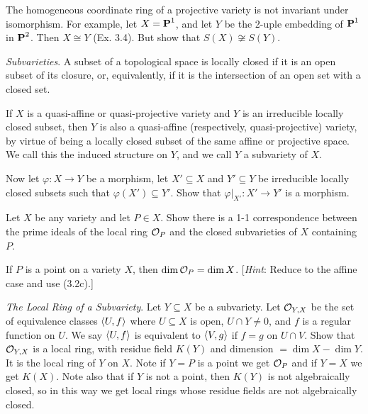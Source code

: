 \documentclass[10pt]{amsart}
\begin{document}
\begin{exercise}[3.9]
    The homogeneous coordinate ring of a projective variety is not invariant under 
    isomorphism. For example, let $X = \operatorname{\mathbf{P}}^1$, and let $Y$ be the 2-uple embedding of $\operatorname{\mathbf{P}}^1$ in $\operatorname{\mathbf{P}}^2$. 
    Then $X \cong Y$ (Ex. 3.4). But show that $S(X) \not\cong S(Y)$.
\end{exercise}


\begin{exercise}[3.10]
    \emph{Subvarieties}. A subset of a topological space is locally closed if it is an 
    open subset of its closure, or, equivalently, if it is the intersection of an open set with 
    a closed set.
    
    If $X$ is a quasi-affine or quasi-projective variety and $Y$ is an irreducible locally closed 
    subset, then $Y$ is also a quasi-affine (respectively, quasi-projective) variety, by virtue 
    of being a locally closed subset of the same affine or projective space. We call this the induced 
    structure on $Y$, and we call $Y$ a subvariety of $X$.
    
    Now let $\varphi:X \to Y$ be a morphism, let $X' \subseteq X$ and $Y' \subseteq Y$ be irreducible locally closed subsets 
    such that $\varphi(X') \subseteq Y'$. Show that $\varphi|_{X'} :X' \to Y'$ 
    is a morphism.
\end{exercise}


\begin{exercise}[3.11]
    Let $X$ be any variety and let $P \in X$. Show there is a 1-1 correspondence between
    the prime ideals of the local ring $\mathcal{O}_P$ and the closed subvarieties of $X$ containing $P$.
\end{exercise}


\begin{exercise}[3.12]
    If $P$ is a point on a variety $X$, then $\dim \mathcal{O}_P = \dim X$. [\emph{Hint}: Reduce to the
    affine case and use (3.2c).]
\end{exercise}


\begin{exercise}[3.13]
    \emph{The Local Ring of a Subvariety}. Let $Y \subseteq X$ be a subvariety. Let $\mathcal{O}_{Y,X}$ be the set 
    of equivalence classes $\left\langle U,f\right\rangle$ where $U \subseteq X$ is open, $U \cap Y \ne 0$, and $f$ is a regular 
    function on $U$. We say $\left\langle U, f\right\rangle$ is equivalent to $\left\langle V, g\right\rangle$ if $f = g$ on $U \cap V$. Show that 
    $\mathcal{O}_{Y,X}$ is a local ring, with residue field $K(Y)$ and dimension $= \dim X - \dim Y$. It is the local ring 
    of $Y$ on $X$. Note if $Y = P$ is a point we get $\mathcal{O}_{P}$ and if $Y = X$ we get $K(X)$. 
    Note also that if $Y$ is not a point, then $K(Y)$ is not algebraically closed, so in this way we 
    get local rings whose residue fields are not algebraically closed.
\end{exercise}
\end{document}

